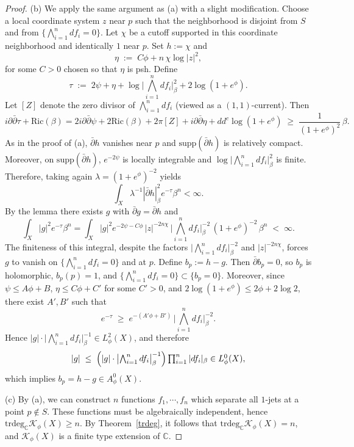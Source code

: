 \documentclass[a4paper, 12pt]{article}
\newcommand{\cK}{\mathcal{K}}
\newcommand{\Ric}{\mathrm{Ric}}
\newcommand{\supp}{\mathrm{supp}}
\newcommand{\trdeg}{\mathrm{trdeg}}
\newcommand{\idd}{i\partial\bar\partial}
\begin{document}
\begin{proof}
\medskip
\noindent (b)
We apply the same argument as (a) with a slight modification.
Choose a local coordinate system $z$ near $p$ such that the neighborhood is disjoint from
$S$ and from $\{\bigwedge_{i=1}^n df_i=0\}$.
Let $\chi$ be a cutoff supported in this coordinate neighborhood and identically $1$ near $p$.
Set $h:=\chi$ and
\[
\eta \;:=\; C\phi + n\,\chi \log|z|^2,
\]
for some $C>0$ chosen so that $\eta$ is psh.
Define
\[
\tau \;:=\; 2\psi+\eta+\log\bigl|\textstyle\bigwedge_{i=1}^n df_i\bigr|_\beta^2 + 2\log(1+e^\phi).
\]
Let $[Z]$ denote the zero divisor of $\bigwedge_{i=1}^n df_i$ (viewed as a $(1,1)$-current).
Then
\[
\idd\tau+\Ric(\beta)
=2\idd\psi+2\Ric(\beta)+2\pi[Z]+\idd\eta+dd^c\log(1+e^\phi)
\;\ge\;\frac{1}{(1+e^\phi)^2}\,\beta.
\]
As in the proof of (a), $\bar\partial h$ vanishes near $p$ and $\supp(\bar\partial h)$ is relatively compact. Moreover, on $\supp(\bar\partial h)$, $e^{-2\psi}$ is locally integrable and $\log\bigl|\textstyle\bigwedge_{i=1}^n df_i\bigr|_\beta^2$ is finite.  Therefore, taking again $\lambda=(1+e^\phi)^{-2}$ yields
\[
\int_X \lambda^{-1}|\bar\partial h|_\beta^2 e^{-\tau}\beta^n<\infty.
\]
By the lemma there exists $g$ with $\bar\partial g=\bar\partial h$ and
\[
\int_X |g|^2 e^{-\tau}\beta^n
=\int_X |g|^2 e^{-2\psi-C\phi}\,|z|^{-2n\chi}\,
\bigl|\textstyle\bigwedge_{i=1}^n df_i\bigr|_\beta^{-2}\,(1+e^\phi)^{-2}\,\beta^n
\;<\;\infty.
\]
The finiteness of this integral, despite the factors
$\bigl|\bigwedge_{i=1}^n df_i\bigr|_\beta^{-2}$ and $|z|^{-2n\chi}$, forces $g$ to vanish on
$\{\bigwedge_{i=1}^n df_i=0\}$ and at $p$.
Define $b_p:=h-g$. Then $\bar\partial b_p=0$, so $b_p$ is holomorphic, $b_p(p)=1$, and
$\{\bigwedge_{i=1}^n df_i=0\}\subset\{b_p=0\}$.
Moreover, since $\psi\le A\phi+B$, $\eta\le C\phi+C'$ for some $C'>0$, and
$2\log(1+e^\phi)\le 2\phi+2\log 2$, there exist $A',B'$ such that
\[
e^{-\tau}\;\ge\; e^{-(A'\phi+B')}\,\bigl|\textstyle\bigwedge_{i=1}^n df_i\bigr|_\beta^{-2}.
\]
Hence $|g|\cdot\bigl|\bigwedge_{i=1}^n df_i\bigr|_\beta^{-1}\in L_\phi^2(X)$, and therefore
\[
|g|\;\le\;\Bigl(|g|\cdot\bigl|\textstyle\bigwedge_{i=1}^n df_i\bigr|_\beta^{-1}\Bigr)
\prod_{i=1}^n |df_i|_\beta \in L_\phi^0(X),
\]
which implies $b_p=h-g\in A_\phi^0(X)$.

\medskip
\noindent (c)
By (a), we can construct $n$ functions $f_1, \cdots, f_n$ which separate all $1$-jets at a point $p\notin S$. These functions must be algebraically independent, hence $\trdeg_{\mathbb{C}} \cK_\phi(X) \ge n$. By Theorem~\ref{trdeg}, it follows that $\trdeg_{\mathbb{C}} \cK_\phi(X) = n$, and $\cK_\phi(X)$ is a finite type extension of $\mathbb{C}$.
\end{proof}
\end{document}
